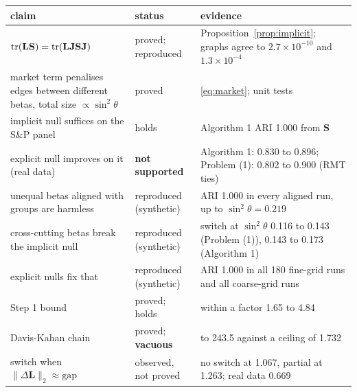 \documentclass[11pt,a4paper]{article}
\newcommand{\Lap}{\mathbf{L}}
\newcommand{\Smat}{\mathbf{S}}
\newcommand{\tr}{\operatorname{tr}}
\theoremstyle{remark}
\begin{document}
\begin{center}
\small
\renewcommand{\arraystretch}{1.2}
\begin{tabular}{>{\raggedright\arraybackslash}p{4.8cm}>{\raggedright\arraybackslash}p{2.6cm}>{\raggedright\arraybackslash}p{7.3cm}}
\toprule
claim & status & evidence \\
\midrule
$\tr(\Lap\Smat)=\tr(\Lap\Jmat\Smat\Jmat)$ & proved; reproduced & Proposition~\ref{prop:implicit}; graphs agree to $2.7\times10^{-10}$ and $1.3\times10^{-4}$ \\
market term penalises edges between different betas, total size $\propto\sin^2\theta$ & proved & \eqref{eq:market}; unit tests \\
implicit null suffices on the S\&P panel & holds & Algorithm 1 ARI 1.000 from $\Smat$ \\
explicit null improves on it (real data) & \textbf{not supported} & Algorithm 1: 0.830 to 0.896; Problem (1): 0.802 to 0.900 (RMT ties) \\
unequal betas aligned with groups are harmless & reproduced (synthetic) & ARI 1.000 in every aligned run, up to $\sin^2\theta=0.219$ \\
cross-cutting betas break the implicit null & reproduced (synthetic) & switch at $\sin^2\theta$ 0.116 to 0.143 (Problem (1)), 0.143 to 0.173 (Algorithm 1) \\
explicit nulls fix that & reproduced (synthetic) & ARI 1.000 in all 180 fine-grid runs and all coarse-grid runs \\
Step 1 bound & proved; holds & within a factor 1.65 to 4.84 \\
Davis-Kahan chain & proved; \textbf{vacuous} & 10.9 to 243.5 against a ceiling of 1.732 \\
switch when $\lVert\Delta\Lap\rVert_2\approx\mathrm{gap}$ & observed, not proved & no switch at 1.067, partial at 1.263; real data 0.669 \\
\bottomrule
\end{tabular}
\end{center}
\end{document}
